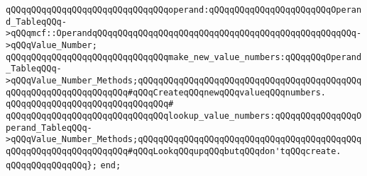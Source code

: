 \verb|qQQqqQQqqQQqqQQqqQQqqQQqqQQqqQQqoperand:qQQqqQQqqQQqqQQqqQQqqQQqOperand_TableqQQq->qQQqmcf::OperandqQQqqQQqqQQqqQQqqQQqqQQqqQQqqQQqqQQqqQQqqQQqqQQqqQQq->qQQqValue_Number;|\newline
\newline
\verb|qQQqqQQqqQQqqQQqqQQqqQQqqQQqqQQqmake_new_value_numbers:qQQqqQQqOperand_TableqQQq->qQQqValue_Number_Methods;qQQqqQQqqQQqqQQqqQQqqQQqqQQqqQQqqQQqqQQqqQQqqQQqqQQqqQQqqQQqqQQqqQQq#qQQqCreateqQQqnewqQQqvalueqQQqnumbers.|\newline
\verb|qQQqqQQqqQQqqQQqqQQqqQQqqQQqqQQq#|\newline
\verb|qQQqqQQqqQQqqQQqqQQqqQQqqQQqqQQqlookup_value_numbers:qQQqqQQqqQQqqQQqOperand_TableqQQq->qQQqValue_Number_Methods;qQQqqQQqqQQqqQQqqQQqqQQqqQQqqQQqqQQqqQQqqQQqqQQqqQQqqQQqqQQqqQQqqQQq#qQQqLookqQQqupqQQqbutqQQqdon'tqQQqcreate.|\newline
\newline
\verb|qQQqqQQqqQQqqQQq};|\newline
\verb|end;|\newline

